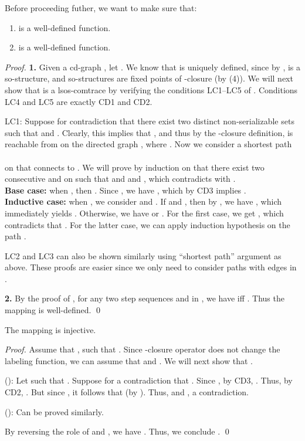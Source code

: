 \documentclass{llncs}
\begin{document}
Before proceeding futher, we want to make sure that:
\begin{lemma}
\begin{enumerate}
\item  is a well-defined function.
\item  is a well-defined function.
\end{enumerate}
\end{lemma}


\begin{proof} \textbf{1. } Given a cd-graph , let . We know that  is uniquely defined, since by ,  is a so-structure, and so-structures are fixed points of -closure (by  (4)). We will next show that  is a lsos-comtrace by verifying the conditions \textsf{LC1}--\textsf{LC5} of . Conditions \textsf{LC4} and \textsf{LC5} are exactly \textsf{CD1} and \textsf{CD2}.

\textsf{LC1}: Suppose for contradiction that there exist two distinct non-serializable sets  such that  and . Clearly, this implies that , and thus by the -closure definition,  is reachable from  on the directed graph , where . Now we consider a shortest path \smallskip\\
\mbox{\hspace{3.3cm}} \smallskip\\
on  that connects  to . We will prove by induction on  that there exist two consecutive  and  on  such that  and  and , which contradicts with  . \\
\textbf{Base case:} when , then . Since , we have , which by \textsf{CD3} implies .\\ \textbf{Inductive case:} when , we consider   and  . If  and , then by ,  we have , which immediately yields . Otherwise, we have  or . For the first case, we get , which contradicts that . For the latter case, we can apply induction hypothesis on the path .

\textsf{LC2} and \textsf{LC3} can also be shown similarly using ``shortest path'' argument as above. These proofs are easier since we only need to consider paths with edges in . 
 
\textbf{2. } By the proof of \cite[Lemma 4.7]{JK95}, for any two step sequences  and  in , we have  iff . Thus the mapping  is well-defined. \qed
\end{proof}



\begin{lemma} The mapping   is injective.
\label{lem:dlinj}
\end{lemma}
\begin{proof} Assume that , such that . Since -closure operator does not change the labeling function, we can assume that  and . We will next show that .

(): Let  such that . Suppose for a contradiction that . Since , by \textsf{CD3},  . Thus, by \textsf{CD2}, . But since , it follows that  (by ). Thus,  and , a contradiction.

(): Can be proved similarly.

By reversing the role of  and , we have . Thus, we conclude .
\qed
\end{proof}
\end{document}
